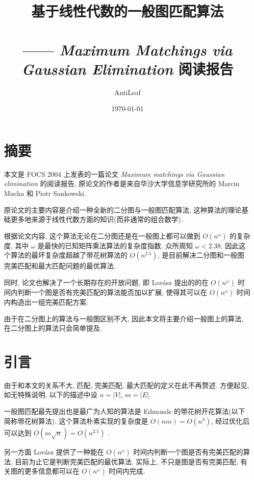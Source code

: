 \documentclass[a4paper]{article}
\title {基于线性代数的一般图匹配算法 \\ ~ \\ \small{—— \emph{Maximum Matchings via Gaussian Elimination} 阅读报告}}
\author {AntiLeaf}
\date {\today}
\begin{document}
	
	\maketitle
	\tableofcontents

	\newpage

	\section{摘要}

		\hspace{2em}本文是 FOCS 2004 上发表的一篇论文 \textit{Maximum matchings via Gaussian elimination} \cite{original} 的阅读报告, 原论文的作者是来自华沙大学信息学研究所的 Marcin Mucha 和 Piotr Sankowski.
		
		原论文的主要内容是介绍一种全新的二分图与一般图匹配算法, 这种算法的理论基础更多地来源于线性代数方面的知识(而非通常的组合数学).

		根据论文内容, 这个算法无论在二分图还是在一般图上都可以做到 $O(n^\omega)$ 的复杂度, 其中 $\omega$ 是最快的已知矩阵乘法算法的复杂度指数. 众所周知 $\omega < 2.38$, 因此这个算法的最坏复杂度超越了带花树算法的 $O(n^{2.5})$, 是目前解决二分图和一般图完美匹配和最大匹配问题的最优算法.

		同时, 论文也解决了一个长期存在的开放问题, 即 Lov\'asz 提出的的在 $O(n^{\omega})$ 时间内判断一个图是否有完美匹配的算法能否加以扩展, 使得其可以在 $O(n^{\omega})$ 时间内构造出一组完美匹配方案.

		由于在二分图上的算法与一般图区别不大, 因此本文将主要介绍一般图上的算法, 在二分图上的算法只会简单提及.

	\section{引言}

		\hspace{2em}由于和本文的关系不大, 匹配, 完美匹配, 最大匹配的定义在此不再赘述. 方便起见, 如无特殊说明, 以下的描述中设 $n = |V|$, $m = |E|$.

		一般图匹配最先提出也是最广为人知的算法是 Edmonds \cite{blossom} 的带花树开花算法(以下简称带花树算法). 这个算法朴素实现的复杂度是 $O(nm) = O(n^3)$, 经过优化后可以达到 $O(m\sqrt n) = O(n^{2.5})$ \cite{optimized} .

		另一方面 Lov\'asz \cite{lovasz} 提供了一种能在 $O(n^\omega)$ 时间内判断一个图是否有完美匹配的算法, 目前为止它是判断完美匹配的最优算法. 实际上, 不只是图是否有完美匹配, 有关图的更多信息都可以在 $O(n^\omega)$ 时间内完成.
\end{document}

